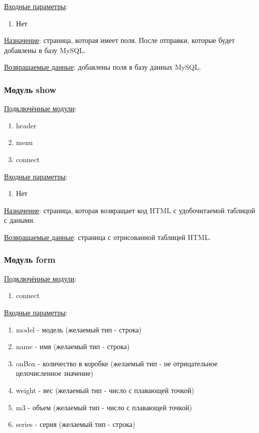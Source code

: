 \underline{Входные параметры}:

\begin{enumerate}
    \item Нет
\end{enumerate}

\underline{Назначение}: страница, которая имеет поля. После отправки, которые будет добавлены в базу MySQL.

\underline{Возвращаемые данные}: добавлены поля в базу данных MySQL.


\subsubsection*{Модуль show}

\underline{Подключённые модули}:

\begin{enumerate}
    \item header
    \item menu
    \item connect
\end{enumerate}

\underline{Входные параметры}:

\begin{enumerate}
    \item Нет
\end{enumerate}

\underline{Назначение}: страница, которая возвращает код HTML с удобочитаемой таблицой с даными.

\underline{Возвращаемые данные}: страница с отрисованной таблицей HTML.


\subsubsection*{Модуль form}

\underline{Подключённые модули}:

\begin{enumerate}
    \item connect
\end{enumerate}

\underline{Входные параметры}:

\begin{enumerate}
    \item model - модель (желаемый тип - строка)
    \item name - имя (желаемый тип - строка)
    \item onBox - количество в коробке (желаемый тип - не отрицательное целочисленное значение)
    \item weight - вес (желаемый тип - число с плавающей точкой)
    \item m3 - объем (желаемый тип - число с плавающей точкой)     
    \item series - серия (желаемый тип - строка) 
\end{enumerate}

